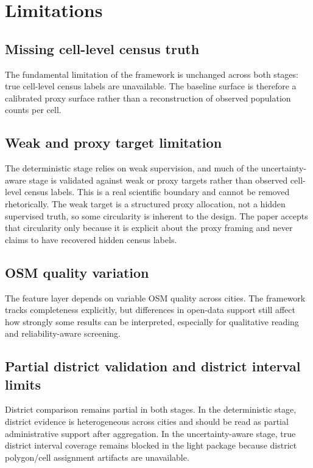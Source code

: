 \section{Limitations}

\subsection{Missing cell-level census truth}

The fundamental limitation of the framework is unchanged across both stages: true cell-level census labels are unavailable. The baseline surface is therefore a calibrated proxy surface rather than a reconstruction of observed population counts per cell.

\subsection{Weak and proxy target limitation}

The deterministic stage relies on weak supervision, and much of the uncertainty-aware stage is validated against weak or proxy targets rather than observed cell-level census labels. This is a real scientific boundary and cannot be removed rhetorically. The weak target is a structured proxy allocation, not a hidden supervised truth, so some circularity is inherent to the design. The paper accepts that circularity only because it is explicit about the proxy framing and never claims to have recovered hidden census labels.

\subsection{OSM quality variation}

The feature layer depends on variable OSM quality across cities. The framework tracks completeness explicitly, but differences in open-data support still affect how strongly some results can be interpreted, especially for qualitative reading and reliability-aware screening.

\subsection{Partial district validation and district interval limits}

District comparison remains partial in both stages. In the deterministic stage, district evidence is heterogeneous across cities and should be read as partial administrative support after aggregation. In the uncertainty-aware stage, true district interval coverage remains blocked in the light package because district polygon/cell assignment artifacts are unavailable.

